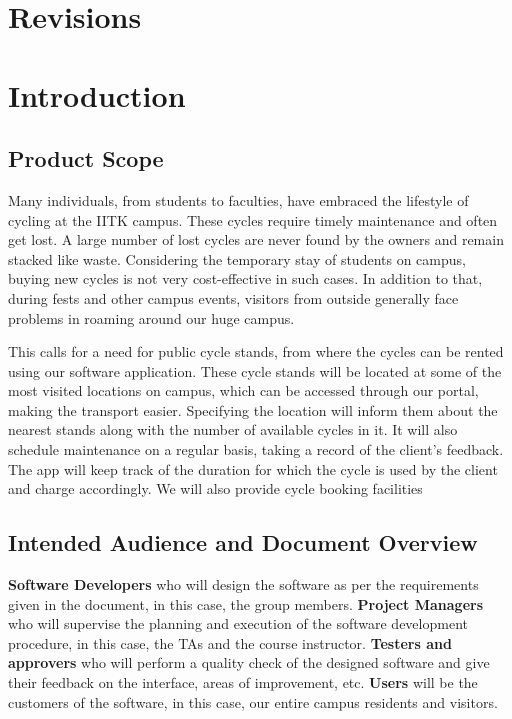 \documentclass{scrreprt}
\begin{document}
\tableofcontents

\chapter{Revisions}

\chapter{Introduction}
\section{Product Scope}
Many individuals, from students to faculties, have embraced the lifestyle of cycling at the IITK campus. These cycles require timely maintenance and often get lost. A large number of lost cycles are never found by the owners and remain stacked like waste. Considering the temporary stay of students on campus, buying new cycles is not very cost-effective in such cases. In addition to that, during fests and other campus events, visitors from outside generally face problems in roaming around our huge campus.

This calls for a need for public cycle stands, from where the cycles can be rented using our  software application. These cycle stands will be located at some of the most visited locations on campus, which can be accessed through our portal, making the transport easier. Specifying the location will inform them about the nearest stands along with the number of available cycles in it.
It will also schedule maintenance on a regular basis, taking a record of the client’s feedback. The app will keep track of the duration for which the cycle is used by the client and charge accordingly. We will also provide cycle booking facilities

\section{Intended Audience and Document Overview}
\textbf{Software Developers} who will design the software as per the requirements given in the document, in this case, the group members. \textbf{Project Managers} who will supervise the planning and execution of the software development procedure, in this case, the TAs and the course instructor. \textbf{Testers and approvers} who will perform a quality check of the designed software and give their feedback on the interface, areas of improvement, etc. \textbf{Users} will be the customers of the software, in this case, our entire campus residents and visitors.
\end{document}
